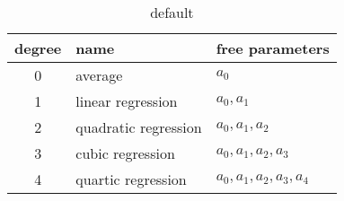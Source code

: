 \begin{table}[b]
	\begin{center}
		\begin{tabular}{cll}
		  degree & name & free parameters \\\hline
		  0 & average & $a_{0}$ \\
		  1 & linear regression & $a_{0}, a_{1}$ \\
		  2 & quadratic regression & $a_{0}, a_{1}, a_{2}$ \\
		  3 & cubic regression & $a_{0}, a_{1}, a_{2}, a_{3}$ \\
		  4 & quartic regression & $a_{0}, a_{1}, a_{2}, a_{3}, a_{4}$ \\
		\end{tabular}
	\end{center}
	\caption{default}
\end{table}%

\endinput  %

